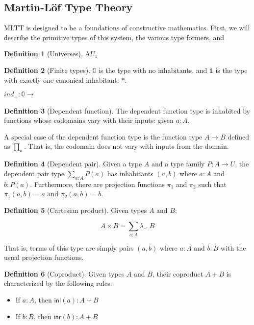 \documentclass[12pt, letterpaper]{article}
\theoremstyle{definition}
\newtheorem{definition}{Definition}[section]
\newcommand{\inl}{\textsf{inl}}
\newcommand{\inr}{\textsf{inr}}
\newcommand{\abst}[2]{\lambda #1.~#2}
\begin{document}
\subsection{Martin-L\"of Type Theory}
MLTT is designed to be a foundations of constructive mathematics. First, we will describe the primitive types of this system, the various type formers, and 

\begin{definition}[Universes]
A$U₁$
\end{definition}

\begin{definition}[Finite types]
$\mathbb{0}$ is the type with no inhabitants, and $\mathbb{1}$ is the type with exactly one canonical inhabitant: $\ast$.

$ind_+ : 𝟘 → $
\end{definition}

\begin{definition}[Dependent function]
The dependent function type is inhabited by functions whose codomains vary with their inputs: given $a : A$. 
\end{definition}



A special case of the dependent function type is the function type $A\to B$ defined as $\prod_{a}$. That is, the codomain does not vary with inputs from the domain.

\begin{definition}[Dependent pair]
Given a type $A$ and a type family $P:A\to U$, the dependent pair type $\sum_{a:A} P(a)$ has inhabitants $(a, b)$ where $a : A$ and $b : P(a)$. Furthermore, there are projection functions $\pi_1$ and $\pi_2$ such that $\pi_1(a , b) = a$ and $\pi_2(a , b) = b$.
\end{definition}

\begin{definition}[Cartesian product]
Given types $A$ and $B$:

$$A\times B=\sum_{a:A}\abst{\_}{B}$$

That is, terms of this type are simply pairs $(a, b)$ where $a : A$ and $b : B$ with the usual projection functions.
\end{definition}

\begin{definition}[Coproduct]
Given types $A$ and $B$, their coproduct $A + B$ is characterized by the following rules:
\begin{itemize}
\item If $a : A$, then $\inl(a) : A + B$
\item If $b : B$, then $\inr(b) : A + B$
\end{itemize}


\end{definition}
\end{document}
